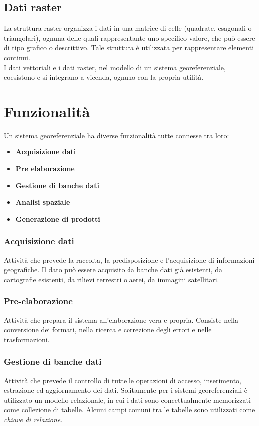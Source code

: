 \subsection{Dati raster}
La struttura raster organizza i dati in una matrice di celle (quadrate, esagonali o triangolari), ognuna delle quali rappresentante uno specifico valore, che può essere di tipo grafico o descrittivo.
Tale struttura è utilizzata per rappresentare elementi continui.\\

I dati vettoriali e i dati raster, nel modello di un sistema georeferenziale, coesistono e si integrano a vicenda, ognuno con la propria utilità.


\section{Funzionalità}
Un sistema georeferenziale ha diverse funzionalità tutte connesse tra loro:
\begin{itemize}
\item \textbf{Acquisizione dati}
\item \textbf{Pre elaborazione}
\item \textbf{Gestione di banche dati}
\item \textbf{Analisi spaziale}
\item \textbf{Generazione di prodotti}
\end{itemize}

\subsubsection{Acquisizione dati}
Attività che prevede la raccolta, la predisposizione e l'acquisizione di informazioni geografiche.
Il dato può essere acquisito da banche dati già esistenti, da cartografie esistenti, da rilievi terrestri o aerei, da immagini satellitari.

\subsubsection{Pre-elaborazione}
Attività che prepara il sistema all'elaborazione vera e propria.
Consiste nella conversione dei formati, nella ricerca e correzione degli errori e nelle trasformazioni.

\subsubsection{Gestione di banche dati}
Attività che prevede il controllo di tutte le operazioni di accesso, inserimento, estrazione ed aggiornamento dei dati.
Solitamente per i sistemi georeferenziali è utilizzato un modello relazionale, in cui i dati sono concettualmente memorizzati come collezione di tabelle.
Alcuni campi comuni tra le tabelle sono utilizzati come \textit{chiave di relazione}.

